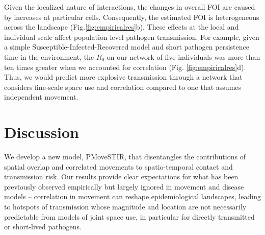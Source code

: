 \documentclass[letterpaper]{article}
\begin{document}
Given the localized nature of interactions, the changes in overall FOI are caused by increases at particular cells. Consequently, the estimated FOI is heterogeneous across the landscape (Fig.\ref{fig:empiricalres}b). These effects at the local and individual scale affect population-level pathogen transmission. For example, given a simple Susceptible-Infected-Recovered model and short pathogen persistence time in the environment, the $R_0$ on our network of five individuals was more than ten times greater when we accounted for correlation (Fig. \ref{fig:empiricalres}d). Thus, we would predict more explosive transmission through a network that considers fine-scale space use and correlation compared to one that assumes independent movement.

\section*{Discussion}

We develop a new model, PMoveSTIR, that disentangles the contributions of spatial overlap and correlated movements to spatio-temporal contact and transmission risk.   Our results provide clear expectations for what has been previously observed empirically but largely ignored in movement and disease models -- correlation in movement can reshape epidemiological landscapes, leading to hotspots of transmission whose magnitude and location are not necessarily predictable from models of joint space use, in particular for directly transmitted or short-lived pathogens.

\end{document}
